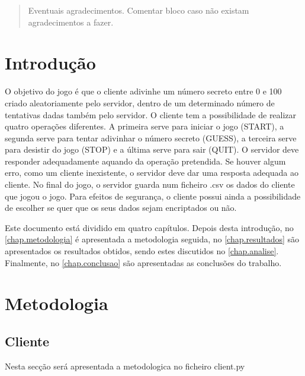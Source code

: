 \documentclass{report}
\begin{document}
\renewcommand{\abstractname}{Agradecimentos}
\begin{abstract}
Eventuais agradecimentos.
Comentar bloco caso não existam agradecimentos a fazer.
\end{abstract}


\tableofcontents


\clearpage
{}

\chapter{Introdução}
\label{chap.introducao}

O objetivo do jogo é que o cliente adivinhe um número secreto entre 0 e 100 criado 
aleatoriamente pelo servidor, dentro de um determinado número de tentativas dadas também
pelo servidor. O cliente tem a possibilidade de realizar quatro operações diferentes. A primeira
serve para iniciar o jogo (START), a segunda serve para tentar adivinhar o número secreto (GUESS), 
a terceira serve para desistir do jogo (STOP) e a última serve para sair (QUIT). O servidor deve responder
adequadamente aquando da operação pretendida. Se houver algum erro, como um cliente inexistente, o 
servidor deve dar uma resposta adequada ao cliente. No final do jogo, o servidor guarda num ficheiro
.csv os dados do cliente que jogou o jogo. Para efeitos de segurança, o cliente possui ainda a
possibilidade de escolher se quer que os seus dados sejam encriptados ou não.

Este documento está dividido em quatro capítulos.
Depois desta introdução,
no \autoref{chap.metodologia} é apresentada a metodologia seguida,
no \autoref{chap.resultados} são apresentados os resultados obtidos,
sendo estes discutidos no \autoref{chap.analise}.
Finalmente, no \autoref{chap.conclusao} são apresentadas
as conclusões do trabalho.


\chapter{Metodologia}
\label{chap.metodologia}
\section{Cliente}
Nesta secção será apresentada a metodologica no ficheiro client.py
\end{document}
